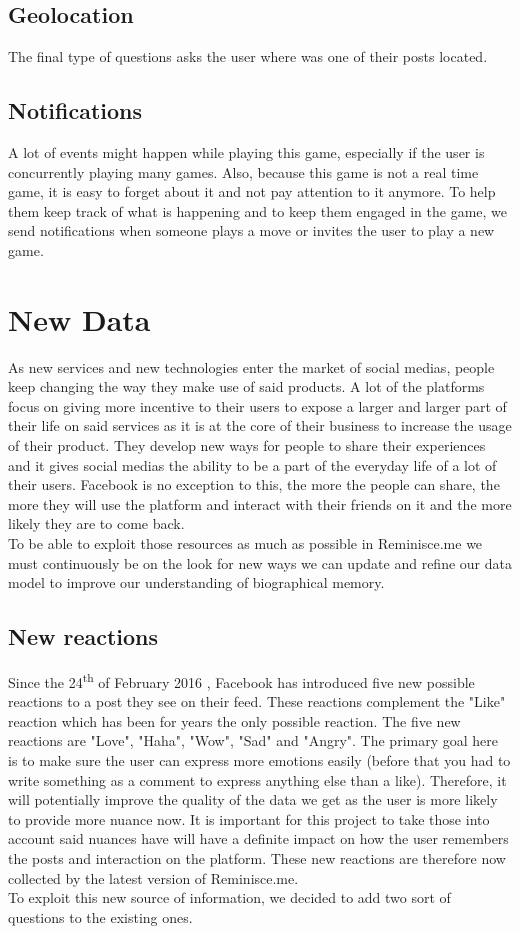 \subsection{Geolocation}
The final type of questions asks the user where was one of their posts located.

\subsection{Notifications}
A lot of events might happen while playing this game, especially if the user is concurrently playing many games. Also, because this game is not a real time game, it is easy to forget about it and not pay attention to it anymore. To help them keep track of what is happening and to keep them engaged in the game, we send notifications when someone plays a move or invites the user to play a new game.

\section{New Data}
As new services and new technologies enter the market of social medias, people keep changing the way they make use of said products. A lot of the platforms focus on giving more incentive to their users to expose a larger and larger part of their life on said services as it is at the core of their business to increase the usage of their product. They develop new ways for people to share their experiences and it gives social medias the ability to be a part of the everyday life of a lot of their users. Facebook is no exception to this, the more the people can share, the more they will use the platform and interact with their friends on it and the more likely they are to come back.\\To be able to exploit those resources as much as possible in Reminisce.me we must continuously be on the look for new ways we can update and refine our data model to improve our understanding of biographical memory.
\subsection{New reactions}\label{subsec:newreacts}
Since the 24\textsuperscript{th} of February 2016 \cite{reactrelease}, Facebook has introduced five new possible reactions to a post they see on their feed. These reactions complement the "Like" reaction which has been for years the only possible reaction. The five new reactions are "Love", "Haha", "Wow", "Sad" and "Angry". The primary goal here is to make sure the user can express more emotions easily (before that you had to write something as a comment to express anything else than  a like). Therefore, it will potentially improve the quality of the data we get as the user is more likely to provide more nuance now. It is important for this project to take those into account said nuances have will have a definite impact on how the user remembers the posts and interaction on the platform. These new reactions are therefore now collected by the latest version of Reminisce.me.\\
To exploit this new source of information, we decided to add two sort of questions to the existing ones.
